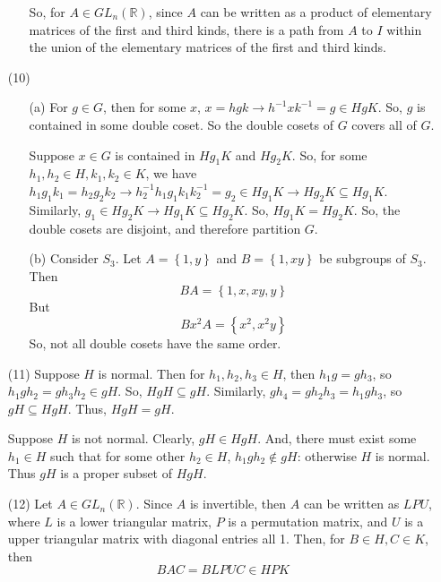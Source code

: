 \documentclass[12pt]{article}
\begin{document}
\begin{itemize}
\begin{itemize}
So, for $A \in GL_n(\mathbb{R})$, since $A$ can be written as a product of elementary matrices of the first and third kinds, there is a path from $A$ to $I$ within the union of the elementary matrices of the first and third kinds.
\end{itemize}
\item[(10)]
\begin{itemize}
\item[(a)]
For $g \in G$, then for some $x$, $x = hgk \rightarrow h^{-1}xk^{-1} = g \in HgK$. So, $g$ is contained in some double coset. So the double cosets of $G$ covers all of $G$.

Suppose $x \in G$ is contained in $Hg_1K$ and $Hg_2K$. So, for some $h_1, h_2 \in H, k_1, k_2 \in K$, we have $h_1g_1k_1 = h_2g_2k_2 \rightarrow h_2^{-1}h_1g_1k_1k_2^{-1} = g_2 \in Hg_1K \rightarrow Hg_2K \subseteq Hg_1K$. Similarly, $g_1 \in Hg_2K \rightarrow Hg_1K \subseteq Hg_2K$. So, $Hg_1K = Hg_2K$. So, the double cosets are disjoint, and therefore partition $G$.
\item[(b)]
Consider $S_3$. Let $A = \left\lbrace 1, y \right\rbrace$ and $B = \left\lbrace 1, xy \right\rbrace$ be subgroups of $S_3$. Then
$$BA = \left\lbrace 1, x, xy, y \right\rbrace$$
But
$$Bx^2A = \left\lbrace x^2, x^2y \right\rbrace$$
So, not all double cosets have the same order.
\end{itemize}
\item[(11)]
Suppose $H$ is normal. Then for $h_1, h_2, h_3 \in H$, then $h_1g = gh_3$, so $h_1gh_2 = gh_3h_2 \in gH$. So, $HgH \subseteq gH$. Similarly, $gh_4 = gh_2h_3 = h_1gh_3$, so $gH \subseteq HgH$. Thus, $HgH = gH$.

Suppose $H$ is not normal. Clearly, $gH \in HgH$. And, there must exist some $h_1 \in H$ such that for some other $h_2 \in H$, $h_1gh_2 \not \in gH$: otherwise $H$ is normal. Thus $gH$ is a proper subset of $HgH$.
\item[(12)]
Let $A \in GL_n(\mathbb{R})$. Since $A$ is invertible, then $A$ can be written as $LPU$, where $L$ is a lower triangular matrix, $P$ is a permutation matrix, and $U$ is a upper triangular matrix with diagonal entries all 1. Then, for $B \in H, C \in K$, then
$$BAC = BLPUC \in HPK$$
\end{itemize}
\end{document}
